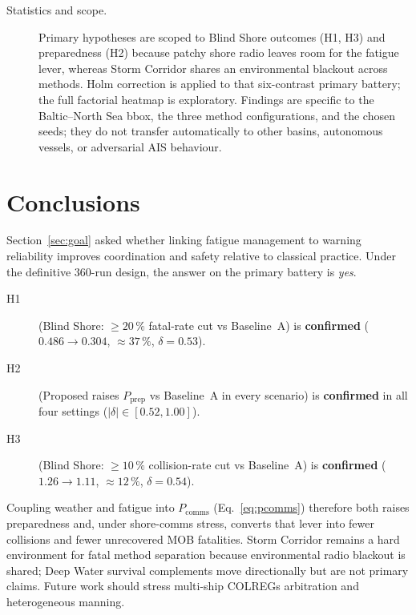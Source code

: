 \documentclass[cameraready]{Interspeech}
\begin{document}
\begin{description}
  \item[Statistics and scope.]
  Primary hypotheses are scoped to Blind Shore outcomes (H1, H3) and preparedness (H2) because patchy shore radio leaves room for the fatigue lever, whereas Storm Corridor shares an environmental blackout across methods. Holm correction is applied to that six-contrast primary battery; the full factorial heatmap is exploratory. Findings are specific to the Baltic--North Sea bbox, the three method configurations, and the chosen seeds; they do not transfer automatically to other basins, autonomous vessels, or adversarial AIS behaviour.

\end{description}

\section{Conclusions}
\label{sec:conclusions}

Section~\ref{sec:goal} asked whether linking fatigue management to warning reliability improves coordination and safety relative to classical practice. Under the definitive $360$-run design, the answer on the primary battery is \emph{yes}.

\begin{description}
  \item[H1] (Blind Shore: ${\geq}20\,\%$ fatal-rate cut vs Baseline~A) is \textbf{confirmed} ($0.486\to0.304$, ${\approx}37\,\%$, $\delta=0.53$).

  \item[H2] (Proposed raises $P_{\mathrm{prep}}$ vs Baseline~A in every scenario) is \textbf{confirmed} in all four settings ($|\delta|\in[0.52,1.00]$).

  \item[H3] (Blind Shore: ${\geq}10\,\%$ collision-rate cut vs Baseline~A) is \textbf{confirmed} ($1.26\to1.11$, ${\approx}12\,\%$, $\delta=0.54$).
\end{description}

Coupling weather and fatigue into $P_{\text{comms}}$ (Eq.~\ref{eq:pcomms}) therefore both raises preparedness and, under shore-comms stress, converts that lever into fewer collisions and fewer unrecovered MOB fatalities. Storm Corridor remains a hard environment for fatal method separation because environmental radio blackout is shared; Deep Water survival complements move directionally but are not primary claims. Future work should stress multi-ship COLREGs arbitration and heterogeneous manning.
\end{document}
